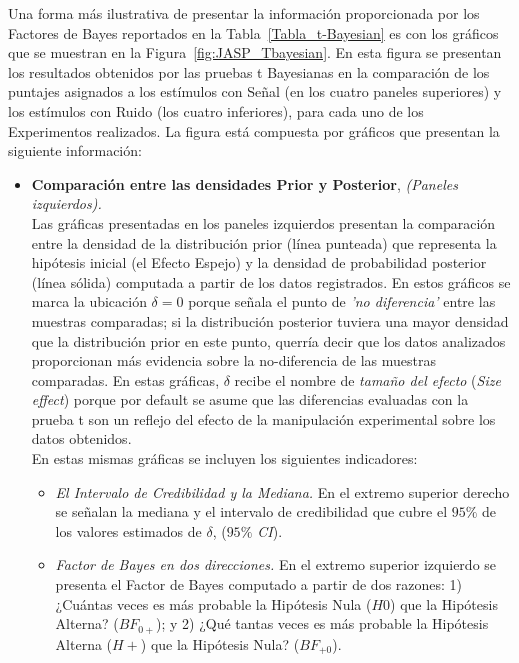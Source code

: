 Una forma más ilustrativa de presentar la información proporcionada por los Factores de Bayes reportados en la Tabla~\ref{Tabla_t-Bayesian} es con los gráficos que se muestran en la Figura~\ref{fig:JASP_Tbayesian}. En esta figura se presentan los resultados obtenidos por las pruebas t Bayesianas en la comparación de los puntajes asignados a los estímulos con Señal (en los cuatro paneles superiores) y los estímulos con Ruido (los cuatro inferiores), para cada uno de los Experimentos realizados. La figura está compuesta por gráficos que presentan la siguiente información:\\

\begin{itemize}
\item \textbf{Comparación entre las densidades Prior y Posterior}, \textit{(Paneles izquierdos).}\\

Las gráficas presentadas en los paneles izquierdos presentan la comparación entre la densidad de la distribución prior (línea punteada) que representa la hipótesis inicial (el Efecto Espejo) y la densidad de probabilidad posterior (línea sólida) computada a partir de los datos registrados. En estos gráficos se marca la ubicación $\delta = 0$ porque señala el punto de \textit{'no diferencia'} entre las muestras comparadas; si la distribución posterior tuviera una mayor densidad que la distribución prior en este punto, querría decir que los datos analizados proporcionan más evidencia sobre la no-diferencia de las muestras comparadas. En estas gráficas, $\delta$ recibe el nombre de \textit{tamaño del efecto} (\textit{\textit{Size effect}}) porque por default se asume que las diferencias evaluadas con la prueba t son un reflejo del efecto de la manipulación experimental sobre los datos obtenidos.\\ 

En estas mismas gráficas se incluyen los siguientes indicadores:\\

\begin{itemize}
	\item \textit{El Intervalo de Credibilidad y la Mediana.} En el extremo superior derecho se señalan la mediana y el intervalo de credibilidad que cubre el $95\%$ de los valores estimados de $\delta$, (\textit{$95\%$ CI}).\\

	\item \textit{Factor de Bayes en dos direcciones.} En el extremo superior izquierdo se presenta el Factor de Bayes computado a partir de dos razones: 1) ¿Cuántas veces es más probable la Hipótesis Nula ($H0$) que la Hipótesis Alterna? ($BF_{0+}$); y 2) ¿Qué tantas veces es más probable la Hipótesis Alterna ($H+$) que la Hipótesis Nula? ($BF_{+0}$).\\


\end{itemize}
\end{itemize}
